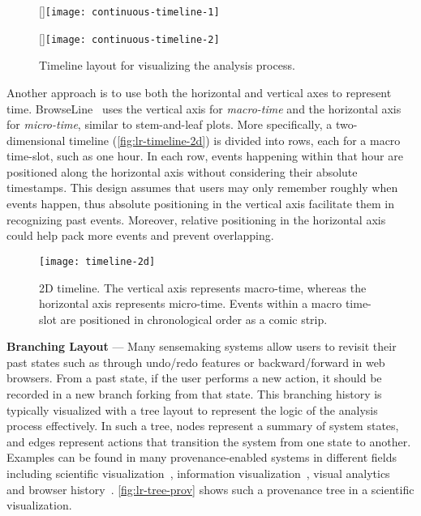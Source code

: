 \begin{figure}
\centering
{}[\columnwidth]{\texttt{[image: continuous-timeline-1]}}

\vspace{.5\baselineskip}

[\columnwidth]{\texttt{[image: continuous-timeline-2]}}
\caption{Timeline layout for visualizing the analysis process.}
\end{figure}

Another approach is to use both the horizontal and vertical axes to represent time. BrowseLine~\cite{Hoeber2009} uses the vertical axis for \emph{macro-time} and the horizontal axis for \emph{micro-time}, similar to stem-and-leaf plots. More specifically, a two-dimensional timeline (\autoref{fig:lr-timeline-2d}) is divided into rows, each for a macro time-slot, such as one hour. In each row, events happening within that hour are positioned along the horizontal axis without considering their absolute timestamps. This design assumes that users may only remember roughly when events happen, thus absolute positioning in the vertical axis facilitate them in recognizing past events. Moreover, relative positioning in the horizontal axis could help pack more events and prevent overlapping.

\begin{figure}
	\centering
	\texttt{[image: timeline-2d]}
	\caption[Two-dimensional timeline]{2D timeline. The vertical axis represents macro-time, whereas the horizontal axis represents micro-time. Events within a macro time-slot are positioned in chronological order as a comic strip. }
	\label{fig:lr-timeline-2d}
\end{figure}

\textbf{Branching Layout} --- Many sensemaking systems allow users to revisit their past states such as through undo/redo features or backward/forward in web browsers. From a past state, if the user performs a new action, it should be recorded in a new branch forking from that state. This branching history is typically visualized with a tree layout to represent the logic of the analysis process effectively. In such a tree, nodes represent a summary of system states, and edges represent actions that transition the system from one state to another. Examples can be found in many provenance-enabled systems in different fields including scientific visualization~\cite{Ma1999}, information visualization~\cite{Dunne2012}, visual analytics~\cite{Kadivar2009} and browser history~\cite{Ayers1995}. \autoref{fig:lr-tree-prov} shows such a provenance tree in a scientific visualization.


